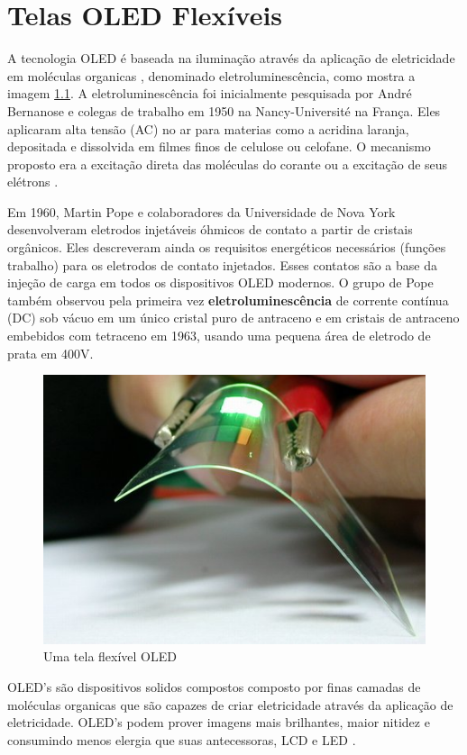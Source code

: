 \chapter{Telas OLED Flexíveis}
\label{cap:oled}

A tecnologia OLED é baseada na iluminação através da aplicação de eletricidade em moléculas organicas \cite{HSWOLED}, denominado    eletroluminescência, como mostra a imagem \ref{fig:oled_early_product}. A eletroluminescência foi inicialmente pesquisada por André Bernanose e colegas de trabalho em 1950 na Nancy-Université na França. Eles aplicaram alta tensão (AC) no ar para materias como a acridina laranja, depositada e dissolvida em filmes finos de celulose ou celofane. O mecanismo proposto era a excitação direta das moléculas do corante ou a excitação de seus elétrons \cite{WikipediaOLED}.

Em 1960, Martin Pope e colaboradores da Universidade de Nova York desenvolveram eletrodos injetáveis óhmicos de contato a partir de cristais orgânicos. Eles descreveram ainda os requisitos energéticos necessários (funções trabalho) para os eletrodos de contato injetados. Esses contatos são a base da injeção de carga em todos os dispositivos OLED modernos. O grupo de Pope também observou pela primeira vez {\bf eletroluminescência} de corrente contínua (DC) sob vácuo em um único cristal puro de antraceno e em cristais de antraceno embebidos com tetraceno em 1963, usando uma pequena área de eletrodo de prata em 400V. \cite{WikipediaOLED}

\begin{figure}[!h]
  \centering
  \includegraphics[width=.40\textwidth]{./figuras/oled_early_product} 
  \caption{Uma tela flexível OLED}
  \label{fig:oled_early_product} 
\end{figure}

OLED's são dispositivos solidos compostos composto por finas camadas de moléculas organicas que são capazes de criar eletricidade através da aplicação de eletricidade. OLED's podem prover imagens mais brilhantes, maior nitidez e consumindo menos elergia que suas antecessoras, LCD e LED \cite{HSWOLED}.

